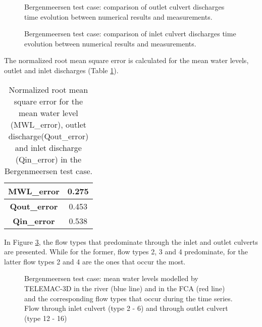 \begin{figure}[H]
\begin{center}
\end{center}
\caption{Bergenmeersen test case: comparison of outlet culvert discharges time evolution between numerical results and measurements.}
\label{fig:bergenmeersen_figure7}
\end{figure}
\begin{figure}[H]
\begin{center}
\end{center}
\caption{Bergenmeersen test case: comparison of inlet culvert discharges time evolution between numerical results and measurements.}
\label{fig:bergenmeersen_figure8}
\end{figure}

The normalized root mean square error is calculated for the mean water levels, outlet and inlet discharges (Table \ref{tab:bergenmeersen_table3}).

\begin{table}[H]
\caption{Normalized root mean square error for the mean water level (MWL\_error),
outlet discharge(Qout\_error) and inlet discharge (Qin\_error)
in the Bergenmeersen test case.}\label{tab:bergenmeersen_table3}
\begin{center}\begin{tabular}{|c|c|}
\hline
\textbf{MWL\_error} & 0.275\\
\hline
\textbf{Qout\_error} & 0.453 \\
\hline
\textbf{Qin\_error} & 0.538 \\
\hline
\end{tabular}\end{center}
\end{table}

In Figure \ref{fig:bergenmeersen_figure9}, the flow types that predominate through the inlet and outlet culverts are presented.
While for the former, flow types 2, 3 and 4 predominate, for the latter flow types 2 and 4 are the ones that occur the most.

\begin{figure}[H]
\begin{center}
\end{center}
\caption{Bergenmeersen test case: mean water levels modelled by TELEMAC-3D in the river (blue line)
and in the FCA (red line) and the corresponding flow types that occur during the time series.
Flow through inlet culvert (type 2 - 6) and through outlet culvert (type 12 - 16)}
\label{fig:bergenmeersen_figure9}
\end{figure}


